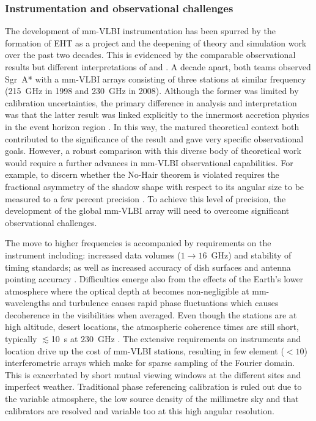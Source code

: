 \subsubsection{Instrumentation and observational challenges}\label{sec:eht_obs}

The development of mm-VLBI instrumentation has been spurred by the formation of EHT as a project and the deepening of theory and simulation work over the past two decades. This is evidenced by the comparable observational results but different interpretations of \citet{Krichbaum_1998} and \citet{Doeleman_2008}. A decade apart, both teams observed Sgr~A* with a mm-VLBI arrays consisting of three stations at similar frequency (215~GHz in 1998 and 230~GHz in 2008). Although the former was limited by calibration uncertainties, the primary difference in analysis and interpretation was that the latter result was linked explicitly to the innermost accretion physics in the event horizon region \citep[e.g.][]{Broderick_2011}. In this way, the matured theoretical context both contributed to the significance of the \citet{Doeleman_2008} result and gave very specific observational goals. However, a robust comparison with this diverse body of theoretical work would require a further advances in mm-VLBI observational capabilities. For example, to discern whether the No-Hair theorem is violated requires the fractional asymmetry of the shadow shape with respect to its angular size to be measured to a few percent precision \citep[e.g.][and references therein]{Goddi_2016}. To achieve this level of precision, the development of the global mm-VLBI array will need to overcome significant observational challenges.

 
The move to higher frequencies is accompanied by requirements on the instrument including: increased data volumes ($1 \to 16$~GHz) and stability of timing standards; as well as increased accuracy of dish surfaces and antenna pointing accuracy \citep{Tilanus_2014}. Difficulties emerge also from the effects of the Earth's lower atmosphere where the optical depth at becomes  non-negligible at mm-wavelengths and turbulence causes rapid phase fluctuations which causes decoherence in the visibilities when averaged. Even though the stations are at high altitude, desert locations, the atmospheric coherence times are still short, typically $\lesssim$10~s at $230$~GHz \citep{Doeleman_2009b}. The extensive requirements on instruments and location drive up the cost of mm-VLBI stations, resulting in few element ($<10$) interferometric arrays which make for sparse sampling of the Fourier domain. This is exacerbated by short mutual viewing windows at the different sites and imperfect weather. Traditional phase referencing calibration is ruled out due to the variable atmosphere, the low source density of the millimetre sky and that calibrators are resolved and variable too at this high angular resolution. 


